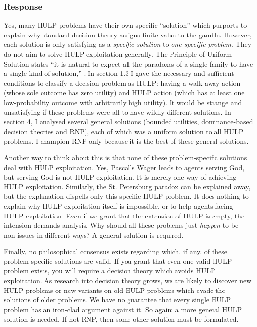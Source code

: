 \documentclass{article}
\begin{document}
\subsubsection*{Response}

Yes, many HULP problems have their own specific ``solution'' which purports to explain why standard decision theory assigns finite value to the gamble. However, each solution is only satisfying as a \textit{specific solution} to \textit{one specific problem}. They do not aim to solve HULP exploitation generally. The Principle of Uniform Solution states ``it is natural to expect all the paradoxes of a single family to have a single kind of solution,'' \citep[pg. 32]{priest1994structure}. In section 1.3 I gave the necessary and sufficient conditions to classify a decision problem as HULP: having a walk away action (whose sole outcome has zero utility) and HULP action (which has at least one low-probability outcome with arbitrarily high utility). It would be strange and unsatisfying if these problems were all to have wildly different solutions. In section 4, I analysed several general solutions (bounded utilities, dominance-based decision theories and RNP), each of which was a uniform solution to all HULP problems. I champion RNP only because it is the best of these general solutions. 

Another way to think about this is that none of these problem-specific solutions deal with HULP exploitation. Yes, Pascal's Wager leads to agents serving God, but serving God is not HULP exploitation. It is merely one way of achieving HULP exploitation. Similarly, the St. Petersburg paradox can be explained away, but the explanation dispells only this specific HULP problem. It does nothing to explain why HULP exploitation itself is impossible, or to help agents facing HULP exploitation. Even if we grant that the extension of HULP is empty, the intension demands analysis. Why should all these problems just \textit{happen} to be non-issues in different ways? A general solution is required. 

Finally, no philosophical consensus exists regarding which, if any, of these problem-specific solutions are valid. If you grant that even one valid HULP problem exists, you will require a decision theory which avoids HULP exploitation. As research into decision theory grows, we are likely to discover new HULP problems \textemdash{} or new variants on old HULP problems \textemdash{} which evade the solutions of older problems. We have no guarantee that every single HULP problem has an iron-clad argument against it. So again: a more general HULP solution is needed. If not RNP, then some other solution must be formulated.
\end{document}
